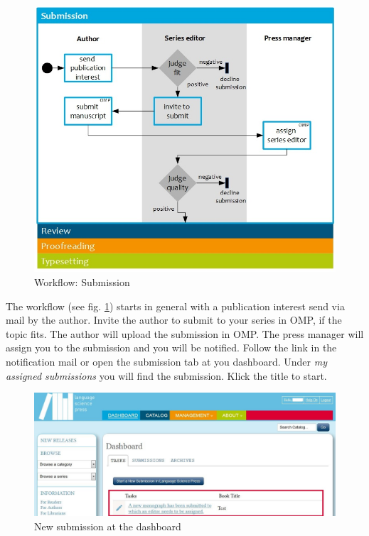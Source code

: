 \begin{figure}[h] \centering
\includegraphics[width=1\textwidth]{./img/workflow_submission.jpg} \caption{Workflow: Submission}
\label{fig:workflowSubmission}
\end{figure}

The workflow (see fig. \ref{fig:workflowSubmission}) starts in general with a publication interest send via mail by the author. Invite the author to submit to your series in OMP, if the topic fits. The author will upload the submission in OMP. The press manager will assign you to the submission and you will be notified. Follow the link in the notification mail or open the submission tab at you dashboard. Under \textit{my assigned submissions} you will find the submission. Klick the title to start. 

\begin{figure}[h] \centering
\includegraphics[width=1\textwidth]{./img/editor-1.jpg} \caption{New submission at the dashboard}
\label{fig:editor1}
\end{figure}

